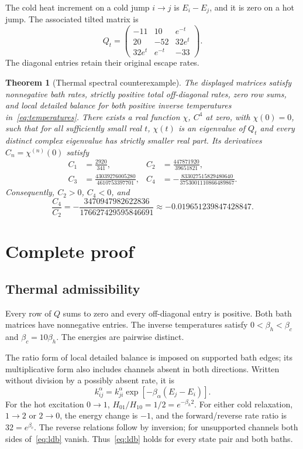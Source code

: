 \documentclass[11pt,a4paper]{article}
\newtheorem{theorem}{Theorem}
\begin{document}
The cold heat increment on a cold jump $i\to j$ is $E_i-E_j$, and it is zero on a hot jump. The associated tilted matrix is
\begin{equation}
Q_t=\begin{pmatrix}
-11&10&e^{-t}\\
20&-52&32e^t\\
32e^t&e^{-t}&-33
\end{pmatrix}.
\label{eq:tilt}
\end{equation}
The diagonal entries retain their original escape rates.

\begin{theorem}[Thermal spectral counterexample]
The displayed matrices satisfy nonnegative bath rates, strictly positive total off-diagonal rates, zero row sums, and local detailed balance for both positive inverse temperatures in~\eqref{eq:temperatures}. There exists a real function $\chi$, $C^4$ at zero, with $\chi(0)=0$, such that for all sufficiently small real $t$, $\chi(t)$ is an eigenvalue of $Q_t$ and every distinct complex eigenvalue has strictly smaller real part. Its derivatives $C_n=\chi^{(n)}(0)$ satisfy
\begin{align}
C_1&=\frac{2920}{341}, &
C_2&=\frac{447871920}{39651821},\label{eq:c12}\\
C_3&=\frac{43039276005280}{4610753397701}, &
C_4&=-\frac{833027515829480640}{3753001110866489867}.
\label{eq:c34}
\end{align}
Consequently, $C_2>0$, $C_4<0$, and
\begin{equation}
\frac{C_4}{C_2}=-\frac{3470947982622836}{176627429595846691}
\approx-0.019651239847428847.
\label{eq:ratio}
\end{equation}
\end{theorem}

\section{Complete proof}
\subsection{Thermal admissibility}
Every row of $Q$ sums to zero and every off-diagonal entry is positive. Both bath matrices have nonnegative entries. The inverse temperatures satisfy $0<\beta_h<\beta_c$ and $\beta_c=10\beta_h$. The energies are pairwise distinct.

The ratio form of local detailed balance is imposed on supported bath edges; its multiplicative form also includes channels absent in both directions. Written without division by a possibly absent rate, it is
\begin{equation}
k^\alpha_{ij}=k^\alpha_{ji}\exp[-\beta_\alpha(E_j-E_i)].
\label{eq:ldb}
\end{equation}
For the hot excitation $0\to1$, $H_{01}/H_{10}=1/2=e^{-\beta_h 2}$. For either cold relaxation, $1\to2$ or $2\to0$, the energy change is $-1$, and the forward/reverse rate ratio is $32=e^{\beta_c}$. The reverse relations follow by inversion; for unsupported channels both sides of~\eqref{eq:ldb} vanish. Thus~\eqref{eq:ldb} holds for every state pair and both baths.
\end{document}
